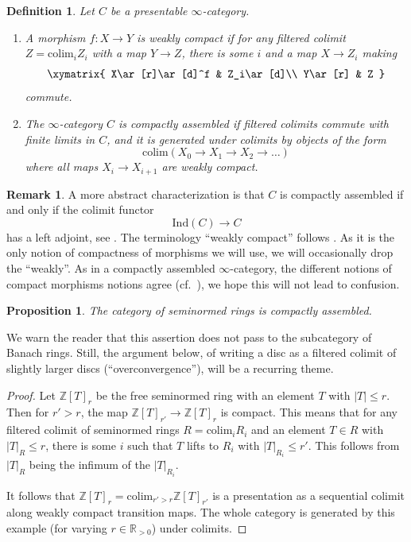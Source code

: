 \documentclass[11pt]{amsart}
\numberwithin{equation}{section}
\numberwithin{theorem}{section}
\newtheorem{proposition}[theorem]{Proposition}
\newtheorem{definition}[theorem]{Definition}
\theoremstyle{definition}
\newtheorem{remark}[theorem]{Remark}
\begin{document}
\begin{definition} Let $C$ be a presentable $\infty$-category.
\begin{enumerate}
\item[{\rm (i)}] A morphism $f: X\to Y$ is weakly compact if for any filtered colimit $Z=\mathrm{colim}_i Z_i$ with a map $Y\to Z$, there is some $i$ and a map $X\to Z_i$ making
\[\xymatrix{
X\ar[r]\ar[d]^f & Z_i\ar[d]\\
Y\ar[r] & Z
}\]
commute.
\item[{\rm (ii)}] The $\infty$-category $C$ is compactly assembled if filtered colimits commute with finite limits in $C$, and it is generated under colimits by objects of the form
\[
\mathrm{colim}(X_0\to X_1\to X_2\to \ldots)
\]
where all maps $X_i\to X_{i+1}$ are weakly compact.
\end{enumerate}
\end{definition}

\begin{remark} A more abstract characterization is that $C$ is compactly assembled if and only if the colimit functor
\[
\mathrm{Ind}(C)\to C
\]
has a left adjoint, see \cite[Theorem 2.39]{Ramzi}. The terminology ``weakly compact'' follows \cite[Definition 2.1]{Ramzi}. As it is the only notion of compactness of morphisms we will use, we will occasionally drop the ``weakly''. As in a compactly assembled $\infty$-category, the different notions of compact morphisms notions agree (cf.~\cite[Example 2.20]{Ramzi}), we hope this will not lead to confusion.
\end{remark}

\begin{proposition} The category of seminormed rings is compactly assembled.
\end{proposition}

We warn the reader that this assertion does not pass to the subcategory of Banach rings. Still, the argument below, of writing a disc as a filtered colimit of slightly larger discs (``overconvergence''), will be a recurring theme.

\begin{proof} Let $\mathbb Z[T]_r$ be the free seminormed ring with an element $T$ with $|T|\leq r$. Then for $r'>r$, the map $\mathbb Z[T]_{r'}\to \mathbb Z[T]_r$ is compact. This means that for any filtered colimit of seminormed rings $R=\mathrm{colim}_i R_i$ and an element $T\in R$ with $|T|_R\leq r$, there is some $i$ such that $T$ lifts to $R_i$ with $|T|_{R_i}\leq r'$. This follows from $|T|_R$ being the infimum of the $|T|_{R_i}$.

It follows that $\mathbb Z[T]_r = \mathrm{colim}_{r'>r} \mathbb Z[T]_{r'}$ is a presentation as a sequential colimit along weakly compact transition maps. The whole category is generated by this example (for varying $r\in \mathbb R_{>0}$) under colimits.
\end{proof}
\end{document}
